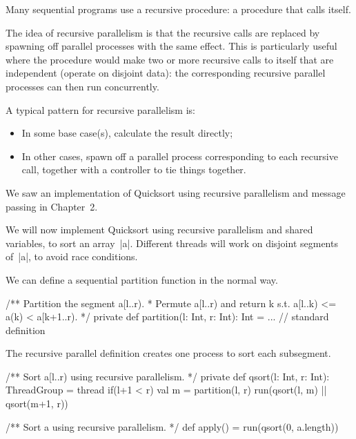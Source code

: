
\begin{slide}

Many sequential programs use a recursive procedure: a procedure that calls
itself.

The idea of recursive parallelism is that the recursive calls are replaced by
spawning off parallel processes with the same effect.  This is particularly
useful where the procedure would make two or more recursive calls to itself
that are independent (operate on disjoint data): the corresponding recursive
parallel processes can then run concurrently.

A typical pattern for recursive parallelism is:
%
\begin{itemize}
\item
In some base case(s), calculate the result directly;

\item
In other cases, spawn off a parallel process corresponding to each recursive
call, together with a controller to tie things together.
\end{itemize}

\end{slide}



\begin{slide}

We saw an implementation of Quicksort using recursive parallelism and message
passing in Chapter~2.

We will now implement Quicksort using recursive parallelism and shared
variables, to sort an array~|a|.  Different threads will work on disjoint
segments of~|a|, to avoid race conditions.

We can define a sequential partition function in the normal way.
%
\begin{scala}
  /** Partition the segment a[l..r).
    * Permute a[l..r) and return k s.t. a[l..k) <= a(k) < a[k+1..r).  */
  private def partition(l: Int, r: Int): Int = ... // standard definition
\end{scala}
\end{slide}


\begin{slide}

The recursive parallel definition creates one process to sort each subsegment.
%
\begin{scala}
  /** Sort a[l..r) using recursive parallelism. */
  private def qsort(l: Int, r: Int): ThreadGroup = thread{
    if(l+1 < r){
      val m = partition(l, r)
      run(qsort(l, m) || qsort(m+1, r))
    }
  }

  /** Sort a using recursive parallelism. */
  def apply() = run(qsort(0, a.length))
\end{scala}
\end{slide}

